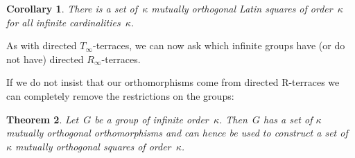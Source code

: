 \documentclass[12pt,a4paper]{article}
\newtheorem{thm}{Theorem}[section]
\newtheorem{cor}[thm]{Corollary}
\begin{document}
\begin{cor}
There is a set of~$\kappa$ mutually orthogonal Latin squares of order~$\kappa$ for all infinite cardinalities~$\kappa$.
\end{cor}

As with directed $T_{\infty}$-terraces, we can now ask which infinite groups have (or do not have) directed $R_{\infty}$-terraces.

If we do not insist that our orthomorphisms come from directed R-terraces we can completely remove the restrictions on the groups:

\begin{thm}
Let~$G$ be a group of infinite order~$\kappa$.  Then~$G$ has a set of $\kappa$ mutually orthogonal orthomorphisms and can hence be used to construct a set of~$\kappa$ mutually orthogonal squares of order~$\kappa$.
\end{thm}
\end{document}
